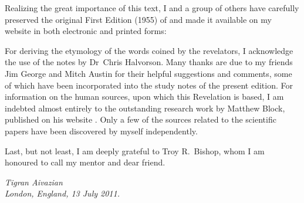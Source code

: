 Realizing the great importance of this text, I and a group of others have carefully preserved
the original First Edition (1955) of 
and made it available on my website in both electronic and printed forms:

\begin{center}
\end{center}

For deriving the etymology of the words coined by the revelators, I acknowledge the use of the notes by Dr~Chris Halvorson.
Many thanks are due to my friends Jim George and Mitch Austin for their helpful suggestions and comments,
some of which have been incorporated into the study notes of the present edition.
For information on the human sources, upon which this Revelation is based, I am indebted almost entirely to the outstanding
research work by Matthew Block, published on his website .
Only a few of the sources related to the scientific papers have been discovered by myself independently.

Last, but not least, I am deeply grateful to Troy R.~Bishop, whom I am honoured to call my mentor and dear friend.


\begin{flushleft}
\itshape
Tigran Aivazian\\
London, England, 13 July 2011.\\
\end{flushleft}

